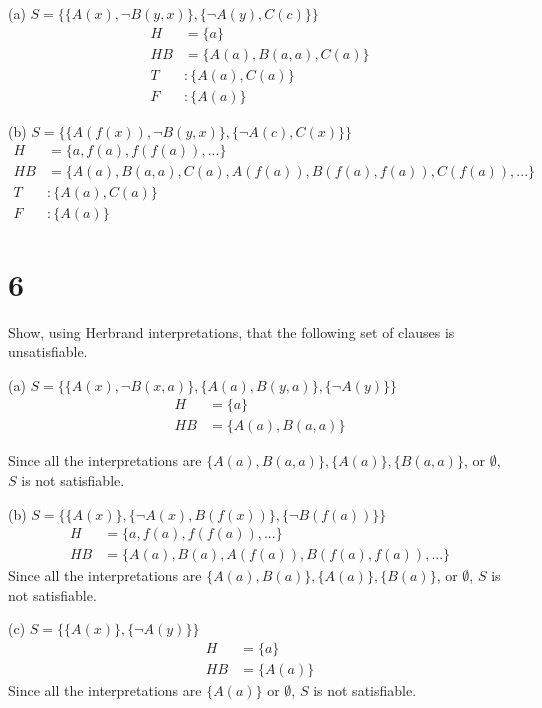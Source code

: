 \documentclass[10pt]{article}
\begin{document}
\begin{description*}
\item[(a)] $S = \{ \{ A(x), \lnot B(y,x) \}, \{ \lnot A(y), C(c) \} \}$
\begin{align*}
H &= \{ a \} \\
HB &= \{ A(a), B(a,a), C(a) \} \\
T&: \{ A(a), C(a) \} \\
F&: \{ A(a) \}
\end{align*}
\item[(b)] $S = \{ \{ A(f(x)), \lnot B(y,x)\}, \{ \lnot A(c),C(x) \} \}$
\begin{align*}
H &= \{ a, f(a), f(f(a)), ... \} \\
HB &= \{ A(a), B(a,a), C(a), A(f(a)), B(f(a), f(a)), C(f(a)), ... \} \\
T&: \{ A(a), C(a) \} \\
F&: \{ A(a) \}
\end{align*}
\end{description*}



\section*{6}
Show, using Herbrand interpretations, that the following set of clauses is unsatisfiable.

\begin{description*}
\item[(a)] $S = \{ \{ A(x), \lnot B(x,a) \}, \{ A(a), B(y,a) \}, \{ \lnot A(y) \} \}$
\begin{align*}
H &= \{ a \} \\
HB &= \{ A(a), B(a,a) \}
\end{align*}

Since all the interpretations are $\{ A(a), B(a,a) \}, \{ A(a) \}, \{ B(a,a) \}$, or $\emptyset$, $S$ is not satisfiable. \\

\item[(b)] $S = \{ \{ A(x)\}, \{ \lnot A(x), B(f(x)) \}, \{ \lnot B(f(a)) \} \}$
\begin{align*}
H &= \{ a, f(a), f(f(a)), ... \} \\
HB &= \{ A(a), B(a), A(f(a)), B(f(a), f(a)), ... \}
\end{align*}
Since all the interpretations are $\{ A(a), B(a) \}, \{ A(a) \}, \{ B(a) \}$, or $\emptyset$, $S$ is not satisfiable. \\

\item[(c)] $S = \{ \{ A(x) \}, \{ \lnot A(y) \} \}$
\begin{align*}
H &= \{ a \} \\
HB &= \{ A(a) \}
\end{align*}
Since all the interpretations are $\{ A(a) \}$ or $\emptyset$, $S$ is not satisfiable. 
\end{description*}
\end{document}
